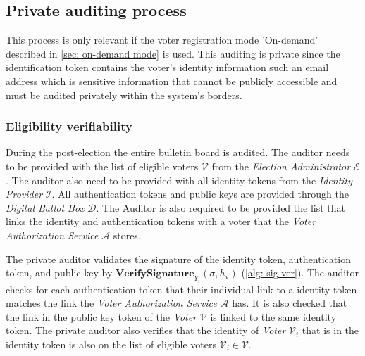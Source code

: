 \subsection{Private auditing process} \label{sec: private auditing process}
This process is only relevant if the voter registration mode 'On-demand' described in \cref{sec: on-demand mode} is used. This auditing is private since the identification token contains the voter's identity information such an email address which is sensitive information that cannot be publicly accessible and must be audited privately within the system's borders.


\subsubsection{Eligibility verifiability}
During the post-election the entire bulletin board is audited. The auditor needs to be provided with the list of eligible voters $\boldsymbol{\mathcal{V}}$ from the \textit{Election Administrator} $\mathcal{E}$. The auditor also need to be provided with all identity tokens from the \textit{Identity Provider} $\mathcal{I}$. All authentication tokens and public keys are provided through the \textit{Digital Ballot Box} $\mathcal{D}$. The Auditor is also required to be provided the list that links the identity and authentication tokens with a voter that the \textit{Voter Authorization Service} $\mathcal{A}$ stores. 

The private auditor validates the signature of the identity token, authentication token, and public key by \( \mathbf{VerifySignature}_{Y_i} (\sigma, h_\mathrm{v}) \) (\cref{alg: sig ver}). The auditor checks for each authentication token that their individual link to a identity token matches the link the \textit{Voter Authorization Service} $\mathcal{A}$ has. It is also checked that the link in the public key token of the \textit{Voter} $\mathcal{V}$ is linked to the same identity token. The private auditor also verifies that the identity of \textit{Voter} $\mathcal{V}_i$ that is in the identity token is also on the list of eligible voters $\mathcal{V}_i \in \boldsymbol{\mathcal{V}}$. 
